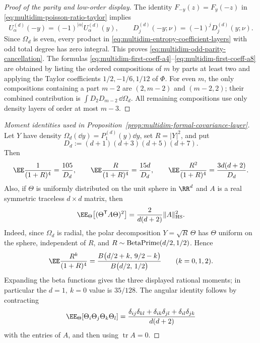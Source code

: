 \begin{proof}[Proof of the parity and low-order display]
The identity \(F_{-y}(z)=F_y(-z)\) in
\eqref{eq:multidim-poisson-ratio-taylor} implies
\[
U_\alpha^{(d)}(-y)=(-1)^{|\alpha|}U_\alpha^{(d)}(y),
\qquad
D_j^{(d)}(-y;\nu)=(-1)^jD_j^{(d)}(y;\nu).
\]
Since \(\Omega_d\) is even, every product in
\eqref{eq:multidim-entropy-coefficient-layers} with odd total degree has zero
integral.  This proves \eqref{eq:multidim-odd-parity-cancellation}.  The
formulas \eqref{eq:multidim-first-coeff-a4}--\eqref{eq:multidim-first-coeff-a8}
are obtained by listing the ordered compositions of \(m\) by parts at least
two and applying the Taylor coefficients \(1/2,-1/6,1/12\) of \(\Phi\).
For even \(m\), the only compositions containing a part \(m-2\) are
\((2,m-2)\) and \((m-2,2)\); their combined contribution is
\(\int D_2D_{m-2}\,\dd\Omega_d\).  All remaining compositions use only
density layers of order at most \(m-3\).
\end{proof}

\begin{proof}[Moment identities used in Proposition~\ref{prop:multidim-formal-covariance-layer}]
Let \(Y\) have density \(\Omega_d(\dd y)=P_1^{(d)}(y)\dd y\), set
\(R=|Y|^2\), and put
\[
D_d:=(d+1)(d+3)(d+5)(d+7).
\]
Then
\[
\EE\frac{1}{(1+R)^4}=\frac{105}{D_d},\qquad
\EE\frac{R}{(1+R)^4}=\frac{15d}{D_d},\qquad
\EE\frac{R^2}{(1+R)^4}=\frac{3d(d+2)}{D_d}.
\]
Also, if \(\Theta\) is uniformly distributed on the unit sphere in \(\RR^d\)
and \(A\) is a real symmetric traceless \(d\times d\) matrix, then
\[
\EE_\Theta\bigl[(\Theta^{\mathsf T}A\Theta)^2\bigr]
=\frac{2}{d(d+2)}\|A\|_{\rm HS}^2 .
\]
Indeed, since \(\Omega_d\) is radial, the polar decomposition
\(Y=\sqrt R\,\Theta\) has \(\Theta\) uniform on the sphere, independent of
\(R\), and \(R\sim{\rm BetaPrime}(d/2,1/2)\).  Hence
\begin{equation}\label{eq:radial-beta-prime-moments}
\EE\frac{R^k}{(1+R)^4}
=
\frac{B\bigl(d/2+k,\,9/2-k\bigr)}
{B\bigl(d/2,\,1/2\bigr)}
\qquad(k=0,1,2).
\end{equation}
Expanding the beta functions gives the three displayed rational moments; in
particular the \(d=1,\ k=0\) value is \(35/128\).
The angular identity follows by contracting
\[
\EE_\Theta[\Theta_i\Theta_j\Theta_k\Theta_l]
=\frac{\delta_{ij}\delta_{kl}
+\delta_{ik}\delta_{jl}
+\delta_{il}\delta_{jk}}{d(d+2)}
\]
with the entries of \(A\), and then using \(\operatorname{tr}A=0\).
\end{proof}


